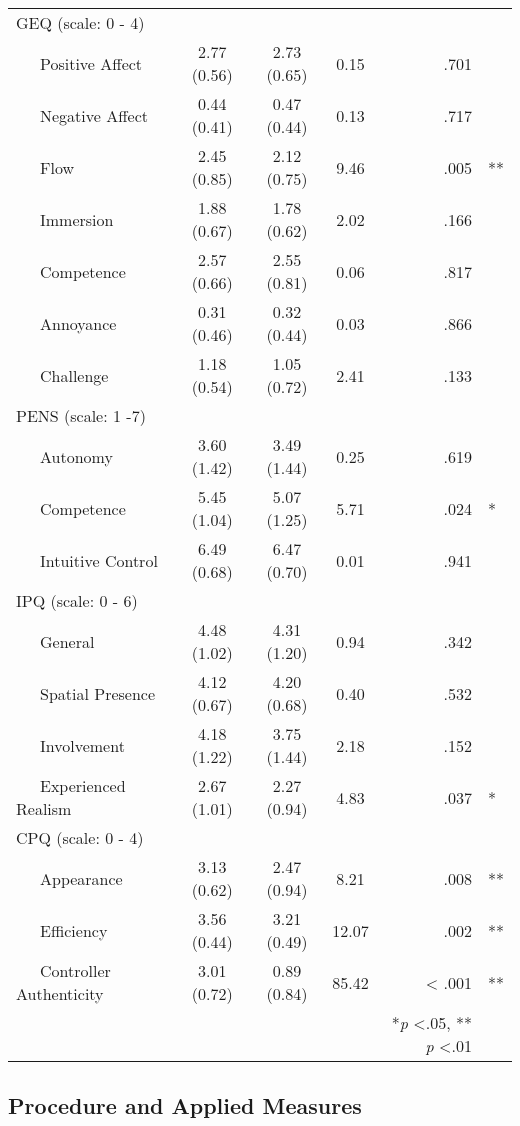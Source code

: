 \documentclass{sigchi}
\begin{document}
\begin{table*}[]
\begin{tabular}{lcccrl}
\midrule
    \addlinespace    
    GEQ (scale: 0 - 4)\\
    \ \ \ Positive Affect 	&	2.77 (0.56)	&	 2.73 (0.65) & 0.15 & .701			\\ 
    \ \ \ Negative Affect	&	0.44 (0.41)	&	 0.47 (0.44) & 0.13 & .717		\\
   	\ \ \ Flow				& 	2.45 (0.85)	&	 2.12 (0.75) & 9.46 & .005&**		\\     
	\ \ \ Immersion 		&	1.88 (0.67)	&	 1.78 (0.62) & 2.02 & .166			\\  
	\ \ \ Competence 		&	2.57 (0.66)	&	 2.55 (0.81) & 0.06 & .817		\\
	\ \ \ Annoyance 		&	0.31 (0.46)	&	 0.32 (0.44) & 0.03 & .866	\\ 
    \ \ \ Challenge 		&	1.18 (0.54)	&	 1.05 (0.72) & 2.41 & .133	\\
    PENS (scale: 1 -7)\\
    \ \ \ Autonomy 				&	3.60 (1.42)	&	3.49 (1.44)	& 0.25 & .619	\\
    \ \ \ Competence 			&	5.45 (1.04)	&	5.07 (1.25)	& 5.71 & .024&*\\
    \ \ \ Intuitive Control 	&	6.49 (0.68)	&	6.47 (0.70)	& 0.01 & .941	\\ 
    IPQ (scale: 0 - 6)\\
    \ \ \ General 				&	4.48 (1.02)	&	4.31 (1.20)	& 0.94 &   	.342\\ 
    \ \ \ Spatial Presence		&	4.12 (0.67)	&	4.20 (0.68)	& 0.40 &   	.532\\
   	\ \ \ Involvement			& 	4.18 (1.22)	&	3.75 (1.44)	& 2.18 &   	.152\\     
	\ \ \ Experienced Realism 	&	2.67 (1.01)	&	2.27 (0.94) & 4.83 &  	.037&*\\  
	CPQ (scale: 0 - 4)\\
	\ \ \ Appearance 			&	3.13 (0.62)	&	2.47 (0.94)	& 8.21 &  .008&**	\\ 
    \ \ \ Efficiency			&	3.56 (0.44)	&	3.21 (0.49)	& 12.07 & .002&**	\\
   	\ \ \ Controller Authenticity & 	3.01 (0.72)	&	0.89 (0.84)	& 85.42 & < .001&**\\     
	
  \bottomrule
  &&&&*\textit{p} <.05, ** \textit{p} <.01
\end{tabular}
\end{table*}

\subsection{Procedure and Applied Measures}
\end{document}
